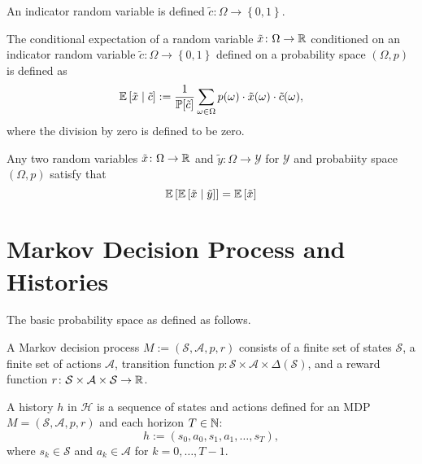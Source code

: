 \begin{definition}
  An indicator random variable is defined $\tilde{c}\colon  \Omega \to \left\{ 0, 1 \right\}$.
  \leanok
\end{definition}

\begin{definition}
  The conditional expectation of a random variable $\tilde{x} \colon \Omega \to \mathbb{R}$ conditioned on an indicator random variable $\tilde{c} \colon \Omega \to  \left\{ 0, 1  \right\}$ defined on a probability space $(\Omega, p)$ is defined as
  \[
    \mathbb{E} \left[ \tilde{x} \mid  \tilde{c} \right] := \frac{1}{\mathbb{P}[\tilde{c}]} \sum_{\omega \in \Omega } p(\omega ) \cdot \tilde{x}(\omega) \cdot \tilde{c}(\omega),
  \]
  where the division by zero is defined to be zero.
\end{definition}

\begin{theorem}
  Any two random variables $\tilde{x} \colon \Omega \to \mathbb{R}$ and $\tilde{y} \colon \Omega \to \mathcal{Y} $ for $\mathcal{Y}$ and probabiity space $(\Omega, p)$ satisfy that
  \[
   \mathbb{E}\left[\mathbb{E}\left[\tilde{x} \mid  \tilde{y}\right]\right] = \mathbb{E} \left[ \tilde{x} \right] 
  \]
\end{theorem}


\section{Markov Decision Process and Histories}

The basic probability space as defined as follows.
\begin{definition}
  A Markov decision process $M := (\mathcal{S}, \mathcal{A}, p, r)$ consists of a finite set of states $\mathcal{S}$, a finite set of actions $\mathcal{A}$, transition function $p\colon \mathcal{S} \times \mathcal{A} \times \Delta(\mathcal{S})$, and a reward function $r \colon \mathcal{S} \times \mathcal{A} \times \mathcal{S} \to \mathbb{R}$.
  \leanok
\end{definition}

\begin{definition}[History]
  A history $h$ in $\mathcal{H}$ is a sequence of states and actions defined for an MDP $M = (\mathcal{S}, \mathcal{A}, p, r)$ and each horizon $T \in \mathbb{N}$:
  \[
    h := (s_0, a_0, s_1, a_1, \dots , s_T),
  \]
  where $s_k \in \mathcal{S}$ and $a_k\in \mathcal{A}$ for $k = 0, \dots , T-1$.
  \leanok
\end{definition}

